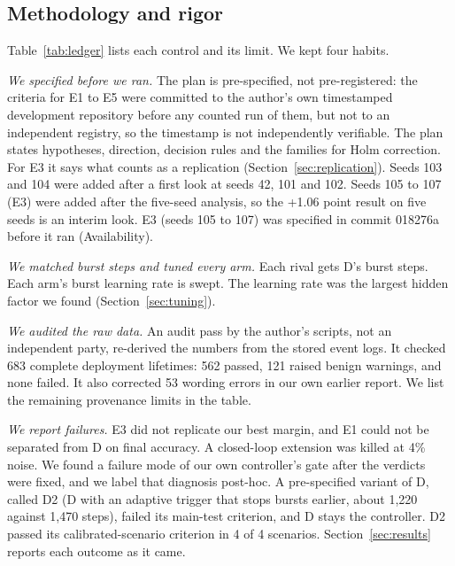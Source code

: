 \documentclass[journal]{IEEEtran}
\begin{document}
\subsection{Methodology and rigor}
\label{sec:honest}
Table~\ref{tab:ledger} lists each control and its limit.
We kept four habits.

\emph{We specified before we ran.}
The plan is pre-specified, not pre-registered: the criteria for E1 to E5 were committed to the author's own timestamped development repository before any counted run of them, but not to an independent registry, so the timestamp is not independently verifiable.
The plan states hypotheses, direction, decision rules and the families for Holm correction.
For E3 it says what counts as a replication (Section~\ref{sec:replication}).
Seeds 103 and 104 were added after a first look at seeds 42, 101 and 102.
Seeds 105 to 107 (E3) were added after the five-seed analysis, so the +1.06 point result on five seeds is an interim look.
E3 (seeds 105 to 107) was specified in commit 018276a before it ran (Availability).

\emph{We matched burst steps and tuned every arm.}
Each rival gets D's burst steps.
Each arm's burst learning rate is swept.
The learning rate was the largest hidden factor we found (Section~\ref{sec:tuning}).

\emph{We audited the raw data.}
An audit pass by the author's scripts, not an independent party, re-derived the numbers from the stored event logs.
It checked 683 complete deployment lifetimes: 562 passed, 121 raised benign warnings, and none failed.
It also corrected 53 wording errors in our own earlier report.
We list the remaining provenance limits in the table.

\emph{We report failures.}
E3 did not replicate our best margin, and E1 could not be separated from D on final accuracy.
A closed-loop extension was killed at 4\% noise.
We found a failure mode of our own controller's gate after the verdicts were fixed, and we label that diagnosis post-hoc.
A pre-specified variant of D, called D2 (D with an adaptive trigger that stops bursts earlier, about 1,220 against 1,470 steps), failed its main-test criterion, and D stays the controller.
D2 passed its calibrated-scenario criterion in 4 of 4 scenarios.
Section~\ref{sec:results} reports each outcome as it came.
\end{document}
